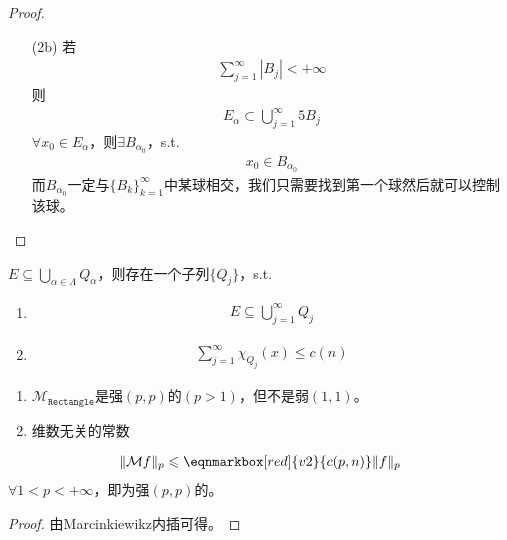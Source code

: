 \begin{proof}
\begin{enumerate}[leftmargin=1cm, label=\arabic*.]
\begin{enumerate}[leftmargin=1cm, label=(\arabic*.)]
        \item[(2b)] 若
        \begin{align*}
            \sum\limits_{j=1}^{\infty} |B_j| < +\infty
        \end{align*}
        则
        \begin{align*}
            E_{\alpha} \subset \bigcup\limits_{j=1}^{\infty} 5B_j
        \end{align*}
        $\forall x_0\in E_{\alpha}$，则$\exists B_{\alpha_0}$，s.t.
        \begin{align*}
            x_0 \in B_{\alpha_0}
        \end{align*}
        而$B_{\alpha_0}$一定与$\{B_k\}_{k=1}^{\infty}$中某球相交，我们只需要找到第一个球然后就可以控制该球。
        
    \end{enumerate}
    \end{enumerate}
\end{proof}


\begin{theorem}[Besicovitch引理]
    $E\subseteq \bigcup\limits_{\alpha\in\Lambda} Q_{\alpha}$，则存在一个子列$\{Q_j\}$，s.t.
    \begin{enumerate}[leftmargin=1cm, label=(\arabic*)]
        \item 
        \begin{align*}
            E\subseteq \bigcup\limits_{j=1}^{\infty} Q_j
        \end{align*}
        \item 
        \begin{align*}
            \sum\limits_{j=1}^{\infty} \chi_{Q_j}(x) \leqslant c(n)
        \end{align*}
    \end{enumerate}
\end{theorem}

\begin{Corollary}
    \begin{enumerate}[leftmargin=1cm, label=\arabic*.]
        \item $\mathcal{M}_{\texttt{Rectangle}}$是强$(p,p)$的$(p>1)$，但不是弱$(1,1)$。
        \item 维数无关的常数
    \end{enumerate}
\end{Corollary}

\begin{theorem}
    \begin{align*}
        \|\mathcal{M}f\|_p \leqslant \eqnmarkbox[red]{v2}{c(p,n)} \|f\|_p
    \end{align*}
    $\forall 1<p<+\infty$，即为强$(p,p)$的。           

\end{theorem}
\begin{proof}
    由Marcinkiewikz内插可得。
\end{proof}



